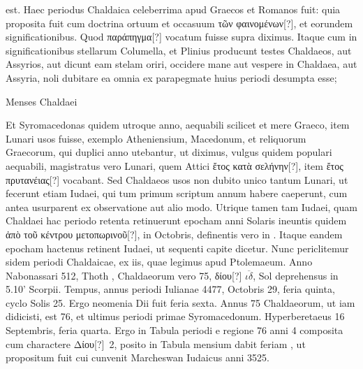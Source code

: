 est.
Haec periodus Chaldaica celeberrima apud Graecos et
Romanos fuit: quia proposita fuit cum doctrina ortuum et occasuum
\textgreek{τῶν φαινομένων[?]}, et eorundem significationibus.
Quod \textgreek{παράπηγμα[?]}
vocatum fuisse supra diximus.
Itaque cum in significationibus stellarum
Columella, et Plinius producunt testes Chaldaeos, aut Assyrios,
aut dicunt eam stelam oriri, occidere mane aut vespere in Chaldaea,
aut Assyria, noli dubitare ea omnia ex parapegmate huius periodi
desumpta esse;
\begin{table}[htbp]
 
 \caption{Menses Chaldaei}
 \label{tab:menses_chaldaei}
\end{table}

Et Syromacedonas quidem utroque anno, aequabili
scilicet et mere Graeco, item Lunari usos fuisse, exemplo Atheniensium,
Macedonum, et reliquorum Graecorum, qui duplici anno
utebantur, ut diximus, vulgus quidem populari aequabili, magistratus
vero Lunari, quem Attici \textgreek{ἔτος κατὰ σελήνην[?]},
 item \textgreek{ἔτος πρυτανέιας[?]}
vocabant.
Sed Chaldaeos usos non dubito unico tantum Lunari,
ut fecerunt etiam Iudaei, qui tum primum scriptum annum
habere caeperunt, cum antea usurparent ex observatione aut alio
modo.
Utrique tamen tam Iudaei, quam Chaldaei hac periodo retenta
retinuerunt epocham anni Solaris ineuntis quidem \textgreek{ἀπὸ τοῦ κέντρου
μετοπωρινοῦ[?]}, in  Octobris, definentis vero in .
Itaque eandem
epocham hactenus retinent Iudaei, ut sequenti capite dicetur.
Nunc periclitemur sidem periodi Chaldaicae, ex iis, quae legimus
apud Ptolemaeum.
Anno Nabonassari 512, Thoth , Chaldaeorum
vero 75, \textgreek{δίου[?]} $\overline{\iota\delta}$,
 Sol deprehensus in 5.10' Scorpii.
Tempus, annus
periodi Iulianae 4477, Octobris 29, feria quinta, cyclo Solis 25.
Ergo neomenia Dii fuit feria sexta.
Annus 75 Chaldaeorum, ut iam
didicisti, est 76, et ultimus periodi primae Syromacedonum.
Hyperberetaeus 16 Septembris, feria quarta.
Ergo in Tabula periodi e regione
76 anni 4 composita cum charactere \textgreek{Δίου[?]}~2, posito in Tabula
mensium dabit feriam , ut propositum fuit cui cunvenit Marcheswan
Iudaicus anni 3525.

